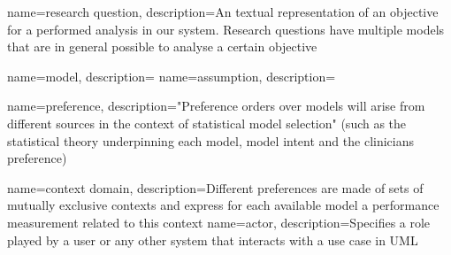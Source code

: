 \newpage
{}




{
  name={research question},
  description={An textual representation of an objective for a performed analysis in our system. Research questions have multiple models that are in general possible to analyse a certain objective}
}

{
  name={model},
  description={}
}
{
  name={assumption},
  description={}
}

{
  name={preference},
  description={"Preference orders over models will arise from different sources in the context of statistical model selection" (such as the statistical theory underpinning each model, model intent and the clinicians preference) \cite{sassoon2016CD}}
}

{
  name={context domain},
  description={Different preferences are made of sets of mutually exclusive contexts and express for each available model a performance measurement related to this context \cite{sassoon2016CD}}
}
{
  name={actor},
  description={Specifies a role played by a user or any other system that interacts with a use case in UML}
}

